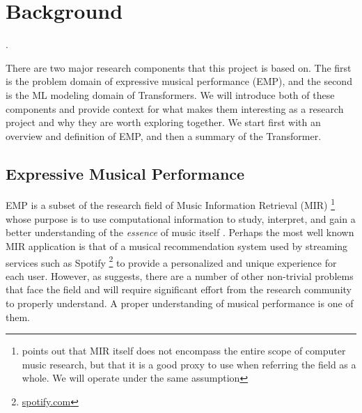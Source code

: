 \chapter{Background}\label{ch:ch2}
. 


There are two major research components that this project is based on. The first is the problem domain of expressive musical performance (EMP), and the second is the ML modeling domain of Transformers. We will introduce both of these components and provide context for what makes them interesting as a research project and why they are worth exploring together. We start first with an overview and definition of EMP, and then a summary of the Transformer. 

\section{Expressive Musical Performance}\label{emp:sec}
EMP is a subset of the research field of Music Information Retrieval (MIR) \footnote{\citet{widmer2016getting} points out that MIR itself does not encompass the entire scope of computer music research, but that it is a good proxy to use when referring the field as a whole. We will operate under the same assumption} whose purpose is to use computational information to study, interpret, and gain a better understanding of the \emph{essence} of music itself \cite{widmer2016getting}. Perhaps the most well known MIR application is that of a musical recommendation system used by streaming services such as Spotify \footnote{\url{spotify.com}} to provide a personalized and unique experience for each user. However, as \citet{widmer2016getting} suggests, there are a number of other non-trivial problems that face the field and will require significant effort from the research community to properly understand. A proper understanding of musical performance is one of them. 

